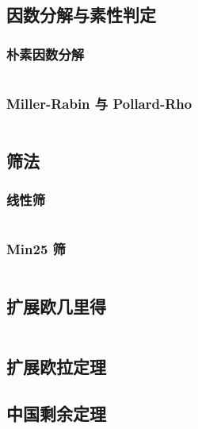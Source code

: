 \documentclass[a4paper, twoside]{article}
\begin{document}
\begin{multicols}{2}
			\subsection{因数分解与素性判定}
				\subsubsection{朴素因数分解}
					\inputminted{cpp}{../src-midori/number/素因数分解.cpp}
				\subsubsection{Miller-Rabin 与 Pollard-Rho}
					\inputminted{cpp}{../src-midori/number/miller_rabin-pollard_rho.cpp}

			\subsection{筛法}
				\subsubsection{线性筛}
					\inputminted{cpp}{../src-midori/number/线性筛.cpp}
				\subsubsection{Min25 筛}
					\inputminted{cpp}{../src-midori/number/min25.cpp}

			\subsection{扩展欧几里得}
				\inputminted{cpp}{../src-midori/number/exgcd.cpp}
			
			\subsection{扩展欧拉定理}
				

			\subsection{中国剩余定理}

\end{multicols}
\end{document}
